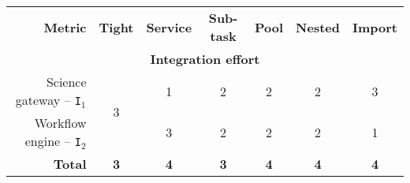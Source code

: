 \documentclass[preprint,3p,twocolumn]{elsarticle}
\begin{document}
\begin{table*}
\centering
\begin{tabular}{rcccccc}
\textbf{Metric}                      & \textbf{Tight}
                                     & \textbf{Service}
                                     & \textbf{Sub-task}
                                     & \textbf{Pool}
                                     & \textbf{Nested}
                                     & \textbf{Import} \\
\multicolumn{7}{c}{\cellcolor[HTML]{EEEEEE}\textbf{Integration effort}}\\
Science gateway -- \texttt{I$_1$}    & \multirow{2}{*}{3}
                                     & \cellcolor[HTML]{99FF99}1
                                     & \cellcolor[HTML]{99FF99}2  
                                     & \cellcolor[HTML]{99FF99}2
                                     & \cellcolor[HTML]{99FF99}2
                                     & \cellcolor[HTML]{99AA99}3 \\
Workflow engine -- \texttt{I$_2$}    &
                                     & \cellcolor[HTML]{99FF99}3 
                                     & \cellcolor[HTML]{99FF99}2
                                     & \cellcolor[HTML]{99AA99}2
                                     & \cellcolor[HTML]{99AA99}2
                                     & \cellcolor[HTML]{99FF99}1 \\
\textbf{Total}                       & \cellcolor[HTML]{99FF99}\textbf{3}
                                     & \cellcolor[HTML]{99FF99}\textbf{4}
                                     & \cellcolor[HTML]{99FF99}\textbf{3}
                                     & \cellcolor[HTML]{99AA99}\textbf{4}
                                     & \cellcolor[HTML]{99AA99}\textbf{4}
                                     & \cellcolor[HTML]{99AA99}\textbf{4} \\


\end{tabular}
\end{table*}
\end{document}
